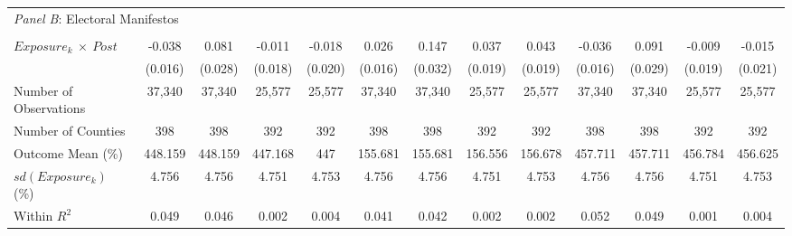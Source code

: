 \begin{tabular}{l*{1}cccccccccccc}
\\ 
\multicolumn{13}{l}{\textit{Panel B}: 
Electoral Manifestos}
\\ \\

$ Exposure_{k}\ \times \ Post $&      -0.038\sym{**} &       0.081\sym{***}&      -0.011         &      -0.018 &       0.026         &       0.147\sym{***}&       0.037\sym{**} &       0.043\sym{**} &      -0.036\sym{**} &       0.091\sym{***}&   
  -0.009         &      -0.015         \\
           &     (0.016)         &     (0.028)         &     (0.018)         &     (0.020)         &     (0.016)         &     (0.032)         &     (0.019)         &     (0.019)         &     (0.016)         &     (0.029)         &     (0.019)         &
    (0.021)         \\
Number of Observations&      37,340         &      37,340         &      25,577         &      25,577         &      37,340         &      37,340         &      25,577         &      25,577         &      37,340         &      37,340         &      25,577
        &      25,577         \\
Number of Counties&         398         &         398         &         392         &         392         &    398         &         398         &         392         &         392         &         398         &         398         &         392    
    &         392         \\
Outcome Mean (\%)&     448.159         &     448.159         &     447.168         &         447         &     155.681         &     155.681         &     156.556         &     156.678         &     457.711         &     457.711         &     456.784     
   &     456.625         \\
$ sd\left(Exposure_k\right) $ (\%)&       4.756         &       4.756         &       4.751         &       4.753         &       4.756         &       4.756         &       4.751         &       4.753         &       4.756         &       4.756         &
      4.751         &       4.753         \\
Within $ R^2 $&       0.049         &       0.046         &       0.002         &       0.004         &       0.041         &       0.042         &       0.002         &       0.002         &       0.052         &       0.049         &       0.001        
&       0.004         \\
\midrule


\end{tabular}
